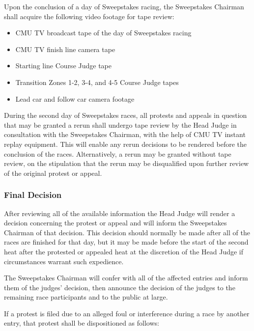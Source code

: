 	Upon the conclusion of a day of Sweepstakes racing, the Sweepstakes Chairman shall acquire the following video footage for tape review:

	\begin{itemize}

		\item CMU TV broadcast tape of the day of Sweepstakes racing

		\item CMU TV finish line camera tape

		\item Starting line Course Judge tape

		\item Transition Zones 1-2, 3-4, and 4-5 Course Judge tapes

		\item Lead car and follow car camera footage

	\end{itemize}


	During the second day of Sweepstakes races, all protests and appeals in question that may be granted a rerun shall undergo tape review by the Head Judge in consultation with the Sweepstakes Chairman, with the help of CMU TV instant replay equipment. This will enable any rerun decisions to be rendered before the conclusion of the races. Alternatively, a rerun may be granted without tape review, on the stipulation that the rerun may be disqualified upon further review of the original protest or appeal.


\subsubsection{Final Decision}

	After reviewing all of the available information the Head Judge will render a decision concerning the protest or appeal and will inform the Sweepstakes Chairman of that decision. This decision should normally be made after all of the races are finished for that day, but it may be made before the start of the second heat after the protested or appealed heat at the discretion of the Head Judge if circumstances warrant such expedience.

	The Sweepstakes Chairman will confer with all of the affected entries and inform them of the judges' decision, then announce the decision of the judges to the remaining race participants and to the public at large.

	\noindent If a protest is filed due to an alleged foul or interference during a race by another entry, that protest shall be dispositioned as follows:

